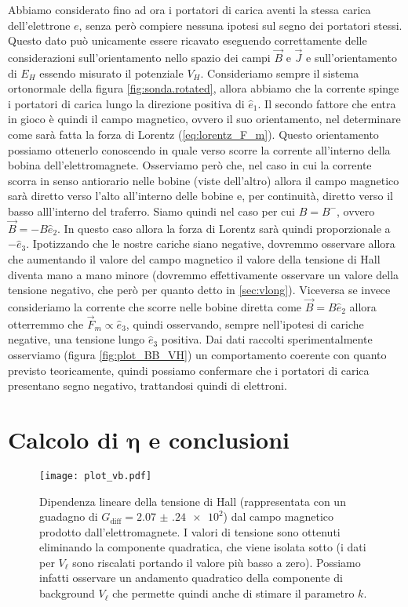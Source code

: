 \documentclass[
    prl,
    reprint, 
    superscriptaddress, 
    altaffilletter, 
    amsmath, 
    amssymb, 
    a4paper,
    varvw]{revtex4-2}
\begin{document}
Abbiamo considerato fino ad ora i portatori di carica aventi la stessa carica dell'elettrone $e$, senza però compiere nessuna ipotesi sul segno dei portatori stessi. Questo dato può unicamente essere ricavato eseguendo correttamente delle considerazioni sull'orientamento nello spazio dei campi $\vec{B}$ e $\vec{J}$ e sull'orientamento di $E_H$ essendo misurato il potenziale $V_H$. Consideriamo sempre il sistema ortonormale della figura \ref{fig:sonda.rotated}, allora abbiamo che la corrente spinge i portatori di carica lungo la direzione positiva di $\hat{e}_1$. Il secondo fattore che entra in gioco è quindi il campo magnetico, ovvero il suo orientamento, nel determinare come sarà fatta la forza di Lorentz (\ref{eq:lorentz_F_m}). Questo orientamento possiamo ottenerlo conoscendo in quale verso scorre la corrente all'interno della bobina dell'elettromagnete. Osserviamo però che, nel caso in cui la corrente scorra in senso antiorario nelle bobine (viste dell'altro) allora il campo magnetico sarà diretto verso l'alto all'interno delle bobine e, per continuità, diretto verso il basso alll'interno del traferro. Siamo quindi nel caso per cui $B=B^-$, ovvero $\vec{B} = -B\hat{e}_2$. In questo caso allora la forza di Lorentz sarà quindi proporzionale a $-\hat{e}_3$. Ipotizzando che le nostre cariche siano negative, dovremmo osservare allora che aumentando il valore del campo magnetico il valore della tensione di Hall diventa mano a mano minore (dovremmo effettivamente osservare un valore della tensione negativo, che però per quanto detto in \ref{sec:vlong}). Viceversa se invece consideriamo la corrente che scorre nelle bobine diretta come $\vec{B}=B\hat{e}_2$ allora otterremmo che $\vec{F}_m \propto \hat{e}_3$, quindi osservando, sempre nell'ipotesi di cariche negative, una tensione lungo $\hat{e}_3$ positiva. Dai dati raccolti sperimentalmente osserviamo (figura \ref{fig:plot_BB_VH}) un comportamento coerente con quanto previsto teoricamente, quindi possiamo confermare che i portatori di carica presentano segno negativo, trattandosi quindi di elettroni. 

\section{Calcolo di $\mathbf\eta$ e conclusioni}\label{sec:computing_eta_and_conlusion}

\begin{figure}
    \centering
    \texttt{[image: plot\_vb.pdf]}
    \caption{Dipendenza lineare della tensione di Hall (rappresentata con un guadagno di $G_\text{diff} = \num{2.07(24)e2}$) dal campo magnetico prodotto dall'elettromagnete. I valori di tensione sono ottenuti eliminando la componente quadratica, che viene isolata sotto (i dati per $V_\ell$ sono riscalati portando il valore più basso a zero). Possiamo infatti osservare un andamento quadratico della componente di background $V_\ell$ che permette quindi anche di stimare il parametro $k$.}\label{fig:plot_vb}
\end{figure}
\end{document}
